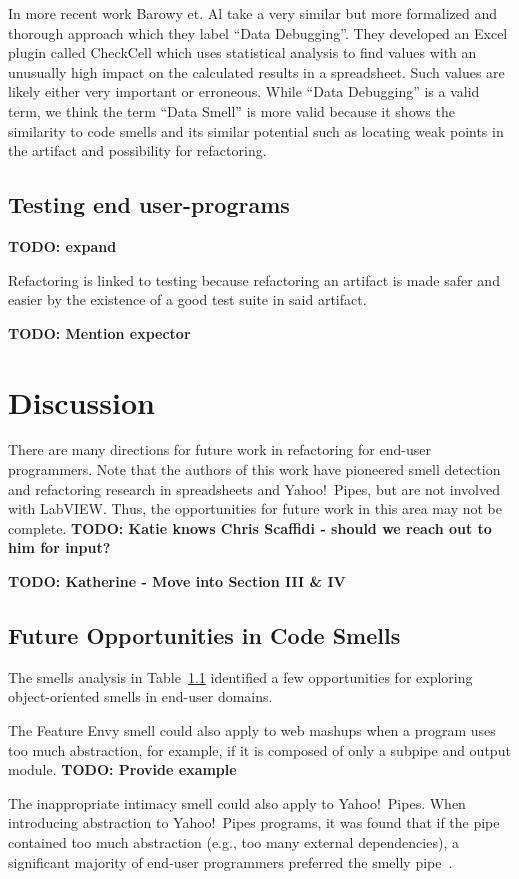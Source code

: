 \documentclass[10pt,conference,compsocconf]{IEEEtran}
\newcommand{\todo}[1]{\textbf{TODO: #1}}
\begin{document}
In more recent work Barowy et. Al \cite{barowy2014checkcell} take a very similar but more formalized and thorough approach which they label ``Data Debugging''.
They developed an Excel plugin called CheckCell which uses statistical analysis to find values with an unusually high impact on the calculated results in a spreadsheet.
Such values are likely either very important or erroneous.
While ``Data Debugging'' is a valid term, we think the term ``Data Smell'' is more valid because it shows the similarity to code smells and its similar potential such as locating weak points in the artifact and possibility for refactoring.

\subsection{Testing end user-programs}

\todo{expand}

Refactoring is linked to testing because refactoring an artifact is made safer and easier by the existence of a good test suite in said artifact.

\todo{Mention expector}

\section{Discussion}
\label{sec:discussion}

There are many directions for future work in refactoring for end-user programmers. Note that the authors of this work have pioneered smell detection and refactoring research in spreadsheets and Yahoo!\ Pipes, but are not involved with LabVIEW. Thus, the opportunities for future work in this area may not be complete.  \todo{Katie knows Chris Scaffidi - should we reach out to him for input?}

\todo{Katherine - Move into Section III \& IV}
\subsection{Future Opportunities in Code Smells}
The smells analysis in Table~\ref{} identified a few opportunities for exploring object-oriented smells in end-user domains. 

The Feature Envy smell could also apply to web mashups when a program uses too much abstraction, for example, if it is composed of only a subpipe and output module. \todo{Provide example}


The inappropriate intimacy smell could also apply to Yahoo!\ Pipes. When introducing abstraction to Yahoo!\ Pipes programs, it was found that if the pipe contained too much abstraction (e.g., too many external dependencies), a significant majority of end-user programmers preferred the smelly pipe~\cite{StoleeTSE2013}.  
\end{document}
